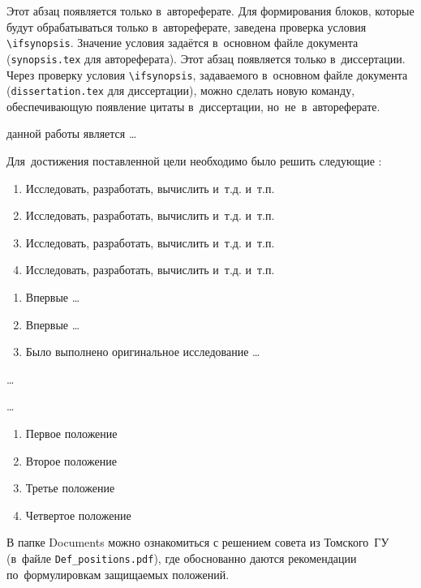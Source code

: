 \ifsynopsis
Этот абзац появляется только в~автореферате.
Для формирования блоков, которые будут обрабатываться только в~автореферате,
заведена проверка условия \verb!\!\verb!ifsynopsis!.
Значение условия задаётся в~основном файле документа (\verb!synopsis.tex! для
автореферата).
\else
Этот абзац появляется только в~диссертации.
Через проверку условия \verb!\!\verb!ifsynopsis!, задаваемого в~основном файле
документа (\verb!dissertation.tex! для диссертации), можно сделать новую
команду, обеспечивающую появление цитаты в~диссертации, но~не~в~автореферате.
\fi


{\aim} данной работы является \ldots

Для~достижения поставленной цели необходимо было решить следующие {\tasks}:
\begin{enumerate}[beginpenalty=10000] %
  \item Исследовать, разработать, вычислить и~т.\:д. и~т.\:п.
  \item Исследовать, разработать, вычислить и~т.\:д. и~т.\:п.
  \item Исследовать, разработать, вычислить и~т.\:д. и~т.\:п.
  \item Исследовать, разработать, вычислить и~т.\:д. и~т.\:п.
\end{enumerate}


{\novelty}
\begin{enumerate}[beginpenalty=10000] %
  \item Впервые \ldots
  \item Впервые \ldots
  \item Было выполнено оригинальное исследование \ldots
\end{enumerate}

{\influence} \ldots

{\methods} \ldots

{}
\begin{enumerate}[beginpenalty=10000] %
  \item Первое положение
  \item Второе положение
  \item Третье положение
  \item Четвертое положение
\end{enumerate}
В папке Documents можно ознакомиться с решением совета из Томского~ГУ
(в~файле \verb+Def_positions.pdf+), где обоснованно даются рекомендации
по~формулировкам защищаемых положений.

